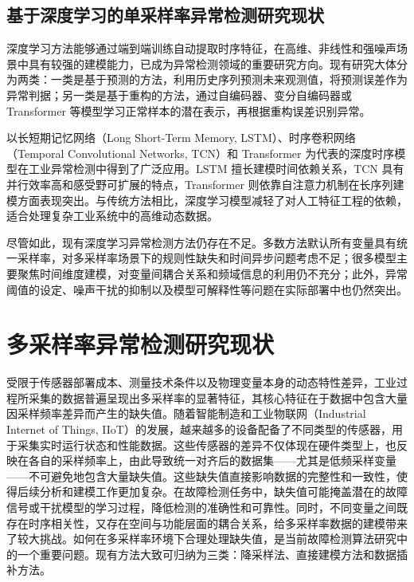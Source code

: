 \documentclass[bachelor, vlined]{DissertUESTC}
\begin{document}
	\subsection{基于深度学习的单采样率异常检测研究现状}

    深度学习方法能够通过端到端训练自动提取时序特征，在高维、非线性和强噪声场景中具有较强的建模能力，已成为异常检测领域的重要研究方向。现有研究大体分为两类：一类是基于预测的方法，利用历史序列预测未来观测值，将预测误差作为异常判据；另一类是基于重构的方法，通过自编码器、变分自编码器或 Transformer 等模型学习正常样本的潜在表示，再根据重构误差识别异常。

    以长短期记忆网络（Long Short-Term Memory, LSTM）、时序卷积网络（Temporal Convolutional Networks, TCN）和 Transformer 为代表的深度时序模型在工业异常检测中得到了广泛应用。LSTM 擅长建模时间依赖关系，TCN 具有并行效率高和感受野可扩展的特点，Transformer 则依靠自注意力机制在长序列建模方面表现突出。与传统方法相比，深度学习模型减轻了对人工特征工程的依赖，适合处理复杂工业系统中的高维动态数据。

    尽管如此，现有深度学习异常检测方法仍存在不足。多数方法默认所有变量具有统一采样率，对多采样率场景下的规则性缺失和时间异步问题考虑不足；很多模型主要聚焦时间维度建模，对变量间耦合关系和频域信息的利用仍不充分；此外，异常阈值的设定、噪声干扰的抑制以及模型可解释性等问题在实际部署中也仍然突出。

	\section{多采样率异常检测研究现状}

    受限于传感器部署成本、测量技术条件以及物理变量本身的动态特性差异，工业过程所采集的数据普遍呈现出多采样率的显著特征，其核心特征在于数据中包含大量因采样频率差异而产生的缺失值。随着智能制造和工业物联网（Industrial Internet of Things, IIoT）的发展，越来越多的设备配备了不同类型的传感器，用于采集实时运行状态和性能数据。这些传感器的差异不仅体现在硬件类型上，也反映在各自的采样频率上，由此导致统一对齐后的数据集——尤其是低频采样变量——不可避免地包含大量缺失值。这些缺失值直接影响数据的完整性和一致性，使得后续分析和建模工作更加复杂。在故障检测任务中，缺失值可能掩盖潜在的故障信号或干扰模型的学习过程，降低检测的准确性和可靠性。同时，不同变量之间既存在时序相关性，又存在空间与功能层面的耦合关系，给多采样率数据的建模带来了较大挑战。如何在多采样率环境下合理处理缺失值，是当前故障检测算法研究中的一个重要问题。现有方法大致可归纳为三类：降采样法、直接建模方法和数据插补方法。
\end{document}

